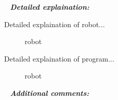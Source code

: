    \newline
  \textit{\textbf{Detailed explaination:}}
  \begin{enumerate*}
  	\item Detailed explaination of robot...
  	\begin{figure}[H]
  		\begin{minipage}[h]{1\linewidth}
  			\caption{robot}
  		\end{minipage}
  	\end{figure}
  	
  	\item Detailed explaination of program...
  	\begin{figure}[H]
  		\begin{minipage}[h]{1\linewidth}
  			\caption{robot}
  		\end{minipage}
  	\end{figure}
  	
  \end{enumerate*}
  
   \newline
  \textit{\textbf{Additional comments:}}
  
\fillpage
